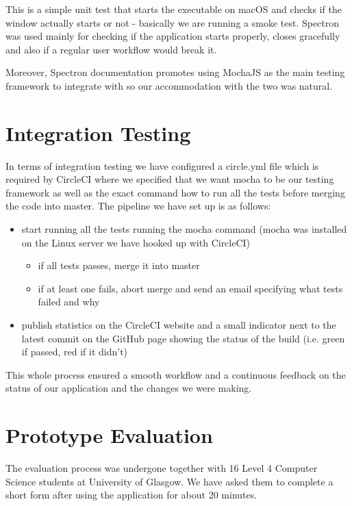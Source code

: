 \documentclass{l4proj}
\begin{document}
This is a simple unit test that starts the executable on macOS and checks if the window actually starts or not -
basically we are running a smoke test. Spectron was used mainly for checking if the application starts properly,
closes gracefully and also if a regular user workflow would break it.

Moreover, Spectron documentation promotes using MochaJS as the main testing framework to integrate with so our
accommodation with the two was natural.

\section{Integration Testing}

In terms of integration testing we have configured a circle.yml file which is required by CircleCI where we specified
that we want mocha to be our testing framework as well as the exact command how to run all the tests before merging
the code into master. The pipeline we have set up is as follows:

\begin{itemize}
  \item start running all the tests running the mocha command (mocha was installed on the Linux server we have hooked
    up with CircleCI)
    \begin{itemize}
      \item if all tests passes, merge it into master
      \item if at least one fails, abort merge and send an email specifying what tests failed and why
    \end{itemize}
  \item publish statistics on the CircleCI website and a small indicator next to the latest commit on the GitHub page
    showing the status of the build
    (i.e. green if passed, red if it didn't)
\end{itemize}

This whole process ensured a smooth workflow and a continuous feedback on the status of our application and the
changes we were making.

\section{Prototype Evaluation}

The evaluation process was undergone together with 16 Level 4 Computer Science students at University of Glasgow. We
have asked them to complete a short form after using the application for about 20 minutes.
\end{document}
